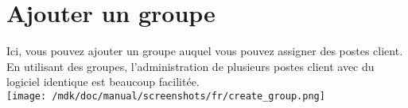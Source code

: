 \section{Ajouter un groupe}Ici, vous pouvez ajouter un groupe auquel vous pouvez assigner des postes client. En utilisant des groupes, l'administration de plusieurs postes client avec du logiciel identique est beaucoup facilit\'ee.\\
\texttt{[image: /mdk/doc/manual/screenshots/fr/create\_group.png]} \\
